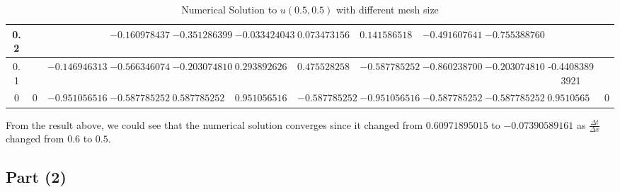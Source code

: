 \begin{answer}
\begin{table}[H]
\begin{adjustbox}{width=\columnwidth,center}
\begin{tabular}{|c|c|c|c|c|c|c|c|c|c|c|c|}
0.2       &      &                  & $-0.16097843733$   & $-0.35128639907$  & $-0.03342404307$  & $0.07347315653$    & $0.14158651853$    & $-0.49160764175$   & $-0.75538876002$   &                 &     \\ \hline
0.1       &      & $-0.14694631307$   & $-0.56634607414$   & $-0.20307481014$  & $0.29389262614$   & $0.47552825814$    & $-0.58778525229$   & $-0.86023870029$   & $-0.20307481014$   & -0.44083893921  &     \\ \hline
0         & 0    & $-0.95105651629$ & $-0.58778525229$ & $0.58778525229$ & $0.95105651629$ & $-0.58778525229$ & $-0.95105651629$ & $-0.58778525229$ & $-0.58778525229$ & $0.95105651629$ & 0   \\ \hline
\end{tabular}
\end{adjustbox}
\caption{Numerical Solution to $u(0.5,0.5)$ with different mesh size}
\label{tab:tab2}
\end{table}

From the result above, we could see that the numerical solution converges since it changed from $0.60971895015$ to $-0.07390589161$ as $\tfrac{\Delta t}{\Delta x}$ changed from $0.6$ to $0.5$.
\end{answer}

\subsection{Part (2)}

